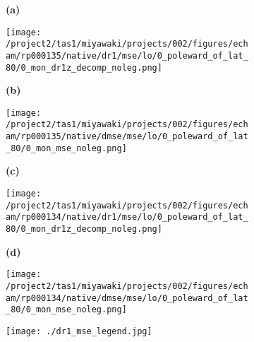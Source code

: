 \documentclass[preview]{standalone}
\begin{document}
\begin{figure}
  \begin{subfigure}[t]{0.05\textwidth}
    \textbf{\large{(a)}}
  \end{subfigure}
  \begin{subfigure}[t]{0.45\textwidth}
    \texttt{[image: /project2/tas1/miyawaki/projects/002/figures/echam/rp000135/native/dr1/mse/lo/0\_poleward\_of\_lat\_80/0\_mon\_dr1z\_decomp\_noleg.png]}
  \end{subfigure}
  \begin{subfigure}[t]{0.05\textwidth}
    \textbf{\large{(b)}}
  \end{subfigure}
  \begin{subfigure}[t]{0.45\textwidth}
    \texttt{[image: /project2/tas1/miyawaki/projects/002/figures/echam/rp000135/native/dmse/mse/lo/0\_poleward\_of\_lat\_80/0\_mon\_mse\_noleg.png]}
  \end{subfigure}

  \begin{subfigure}[t]{0.05\textwidth}
    \textbf{\large{(c)}}
  \end{subfigure}
  \begin{subfigure}[t]{0.45\textwidth}
    \texttt{[image: /project2/tas1/miyawaki/projects/002/figures/echam/rp000134/native/dr1/mse/lo/0\_poleward\_of\_lat\_80/0\_mon\_dr1z\_decomp\_noleg.png]}
  \end{subfigure}
  \begin{subfigure}[t]{0.05\textwidth}
    \textbf{\large{(d)}}
  \end{subfigure}
  \begin{subfigure}[t]{0.45\textwidth}
    \texttt{[image: /project2/tas1/miyawaki/projects/002/figures/echam/rp000134/native/dmse/mse/lo/0\_poleward\_of\_lat\_80/0\_mon\_mse\_noleg.png]}
  \end{subfigure}

  \begin{subfigure}[t]{\textwidth}
    \texttt{[image: ./dr1\_mse\_legend.jpg]}
  \end{subfigure}

\end{figure}
\end{document}
